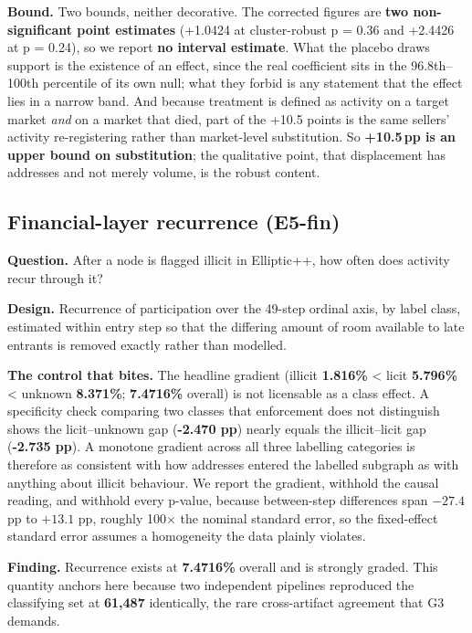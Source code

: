 \textbf{Bound.} Two bounds, neither decorative. The corrected figures are
\textbf{two non-significant point estimates} (+1.0424 at cluster-robust p = 0.36
and +2.4426 at p = 0.24), so we report \textbf{no interval estimate}. What the
placebo draws support is the existence of an effect, since the real coefficient
sits in the 96.8th--100th percentile of its own null; what they forbid is any
statement that the effect lies in a narrow band. And because treatment is
defined as activity on a target market \emph{and} on a market that died, part of
the +10.5 points is the same sellers' activity re-registering rather than
market-level substitution. So \textbf{+10.5\,pp is an upper bound on
substitution}; the qualitative point, that displacement has addresses and not
merely volume, is the robust content.

\subsection{Financial-layer recurrence (E5-fin)}

\textbf{Question.} After a node is flagged illicit in Elliptic++, how often does
activity recur through it?

\textbf{Design.} Recurrence of participation over the 49-step ordinal axis, by
label class, estimated within entry step so that the differing amount of room
available to late entrants is removed exactly rather than modelled.

\textbf{The control that bites.} The headline gradient (illicit \textbf{1.816\%}
\textless{} licit \textbf{5.796\%} \textless{} unknown \textbf{8.371\%};
\textbf{7.4716\%} overall) is not licensable as a class effect. A specificity
check comparing two classes that enforcement does not distinguish shows the
licit--unknown gap (\textbf{-2.470 pp}) nearly equals the illicit--licit gap
(\textbf{-2.735 pp}). A monotone gradient across all three labelling categories
is therefore as consistent with how addresses entered the labelled subgraph as
with anything about illicit behaviour. We report the gradient, withhold the
causal reading, and withhold every p-value, because between-step differences
span $-27.4$ pp to $+13.1$ pp, roughly 100$\times$ the nominal standard error, so
the fixed-effect standard error assumes a homogeneity the data plainly violates.

\textbf{Finding.} Recurrence exists at \textbf{7.4716\%} overall and is strongly
graded. This quantity anchors here because two independent pipelines reproduced
the classifying set at \textbf{61,487} identically, the rare cross-artifact
agreement that G3 demands.

